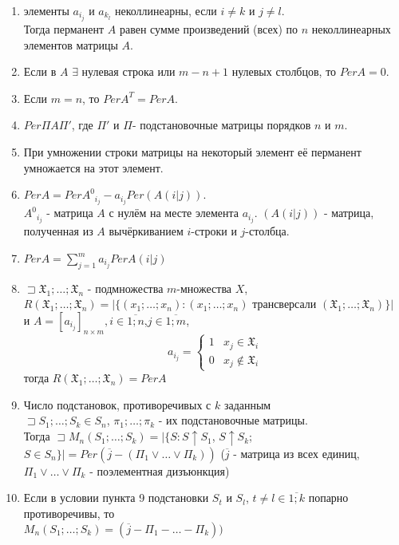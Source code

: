 \begin{enumerate}
	\item \opr элементы $a_{i_j}$ и $a_{k_l}$ неколлинеарны, если $i\neq k$ и $j\neq l$.\\Тогда перманент $A$ равен сумме произведений (всех) по $n$ неколлинеарных элементов матрицы $A$.
	\item Если в $A$ $\exists$ нулевая строка или $m-n+1$ нулевых столбцов, то $Per A=0$.
 	\item Если $m=n$, то $Per A^T = Per A$.
	\item $Per \Pi A\Pi'$, где $\Pi'$ и $\Pi$- подстановочные матрицы порядков $n$ и $m$.
	\item При умножении строки матрицы на некоторый элемент её перманент умножается на этот элемент.
	\item $Per A=Per {A^0}_{i_j} - a_{i_j} Per(A(i|j))$. \\${A^0}_{i_j}$ - матрица $A$ с нулём на месте элемента $a_{i_j}$. $(A(i|j))$ - матрица, полученная из $A$ вычёркиванием $i$-строки и $j$-столбца.
	\item $Per A = \sum\limits_{j=1}^m a_{i_j} Per A(i|j)$
	\item $\sqsupset \mathfrak{X}_1; \ldots;\mathfrak{X}_n$ - подмножества $m$-множества $X$, \\$R(\mathfrak{X}_1;\ldots;\mathfrak{X}_n)=|\{(x_1;\ldots;x_n):(x_1;\ldots;x_n)$ трансверсали $(\mathfrak{X}_1;\ldots;\mathfrak{X}_n)\}|$ \\и $A=[a_{i_j}]_{n \times m},i\in\overline{1;n}$,$j\in\overline{1;m}$,  
        \begin{equation*}
            a_{i_j} = 
            \begin{cases}
            1 &\text{$x_j \in \mathfrak{X}_i$}\\
            0 &\text{$x_j \notin \mathfrak{X}_i$}
            \end{cases}
            \end{equation*}
            тогда $R(\mathfrak{X}_1;\ldots;\mathfrak{X}_n)=PerA$
    \item Число подстановок, противоречивых с $k$ заданным \\$\sqsupset S_1;\ldots;S_k \in S_n$, $\pi_1;\ldots;\pi_k$ - их подстановочные матрицы. \\ Тогда $\sqsupset M_n(S_1;\ldots;S_k)=|\{S:S\uparrow S_1$, $S\uparrow S_k$; $S\in S_n \} | = Per(\overline j-(\Pi_1\vee \ldots \vee \Pi_k))$ ($\overline j$ - матрица из всех единиц, $\Pi_1\vee \ldots \vee \Pi_k$ - поэлементная дизъюнкция)
    \item Если в условии пункта 9 подстановки $S_t$ и $S_l$, $t \neq l \in \overline{1;k}$ попарно противоречивы, то \\$M_n(S_1; \ldots; S_k)=(\overline j - \Pi_1 - \ldots - \Pi_k))$

\end{enumerate}
